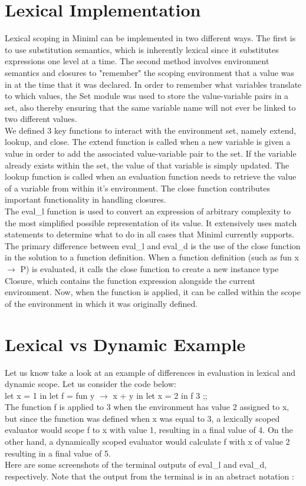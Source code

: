 \documentclass{article}
\begin{document}
\section{Lexical Implementation}
Lexical scoping in Miniml can be implemented in two different ways. The first is to use substitution semantics, which is inherently lexical since it substitutes expressions one level at a time. The second method involves environment semantics and closures to "remember" the scoping environment that a value was in at the time that it was declared. In order to remember what variables translate to which values, the Set module was used to store the value-variable pairs in a set, also thereby ensuring that the same variable name will not ever be linked to two different values. \\
We defined 3 key functions to interact with the environment set, namely extend, lookup, and close. The extend function is called when a new variable is given a value in order to add the associated value-variable pair to the set. If the variable already exists within the set, the value of that variable is simply updated. The lookup function is called when an evaluation function needs to retrieve the value of a variable from within it's environment. The close function contributes important functionality in handling closures. \\
The eval{\_}l function is used to convert an expression of arbitrary complexity to the most simplified possible representation of its value. It extensively uses match statements to determine what to do in all cases that Miniml currently supports. The primary difference between eval{\_}l and eval{\_}d is the use of the close function in the solution to a function definition. When a function definition (such as fun x $\rightarrow$ P) is evaluated, it calls the close function to create a new instance type Closure, which contains the function expression alongside the current environment. Now, when the function is applied, it can be called within the scope of the environment in which it was originally defined. 

\section{Lexical vs Dynamic Example}
Let us know take a look at an example of differences in evaluation in lexical and dynamic scope. Let us consider the code below: \\
let x = 1 in 
let f = fun y $\rightarrow$ x + y in 
let x = 2 in 
f 3 ;; \\
The function f is applied to 3 when the environment has value 2 assigned to x, but since the function was defined when x was equal to 3, a lexically scoped evaluator would scope f to x with value 1, resulting in a final value of 4. On the other hand, a dynamically scoped evaluator would calculate f with x of value 2 resulting in a final value of 5. \\
Here are some screenshots of the terminal outputs of eval{\_}l and eval{\_}d, respectively. Note that the output from the terminal is in an abstract notation : \\
\end{document}
